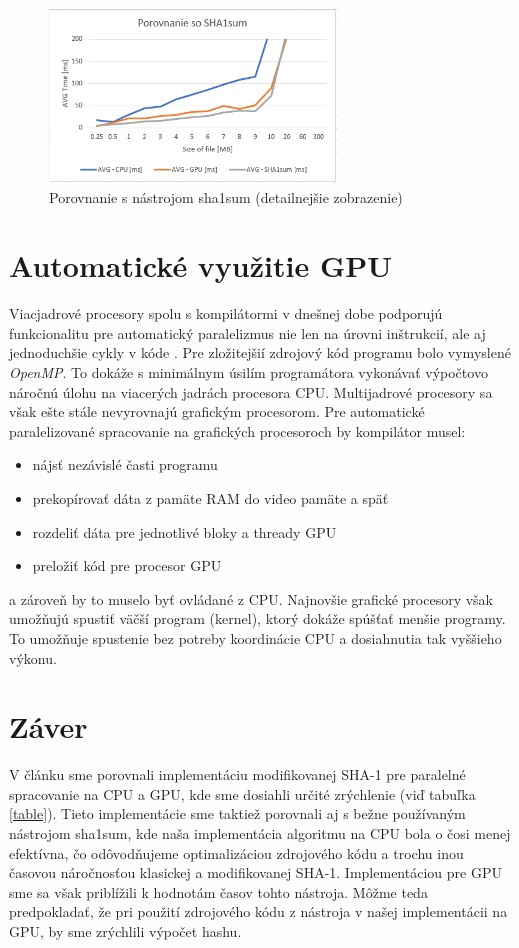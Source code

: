 \documentclass[conference]{IEEEtran}
\begin{document}
\begin{figure}[h!]
\centering
\includegraphics[width=3in]{img/sha1sumdetail}
\caption{Porovnanie s nástrojom sha1sum  (detailnejšie zobrazenie)}
\end{figure}


\section{Automatické využitie GPU}

Viacjadrové procesory spolu s kompilátormi v dnešnej dobe podporujú funkcionalitu pre automatický paralelizmus nie len na úrovni inštrukcií, ale aj jednoduchšie cykly v kóde \cite{automatic}. Pre zložitejšií zdrojový kód programu bolo vymyslené \textit{OpenMP}. To dokáže s minimálnym úsilím programátora vykonávať výpočtovo náročnú úlohu na viacerých jadrách procesora CPU.
Multijadrové procesory sa však ešte stále nevyrovnajú grafickým procesorom. Pre automatické paralelizované spracovanie na grafických procesoroch by kompilátor musel:

\begin{itemize}
	\item{nájsť nezávislé časti programu}
	\item{prekopírovať dáta z pamäte RAM do video pamäte a späť}
	\item{rozdeliť dáta pre jednotlivé bloky a thready GPU}
	\item{preložiť kód pre procesor GPU}
\end{itemize}

a zároveň by to muselo byť ovládané z CPU. Najnovšie grafické procesory však umožňujú spustiť väčší program (kernel), ktorý dokáže spúšťať menšie programy. To umožňuje spustenie bez potreby koordinácie CPU \cite{tatourian} a dosiahnutia tak vyššieho výkonu.

\section{Záver}
V článku sme porovnali implementáciu modifikovanej SHA-1 pre paralelné spracovanie na CPU a GPU, kde sme dosiahli určité zrýchlenie (viď tabuľka \ref{table}). Tieto implementácie sme taktiež porovnali aj s bežne používaným nástrojom sha1sum, kde naša implementácia algoritmu na CPU bola o čosi menej efektívna, čo odôvodňujeme optimalizáciou zdrojového kódu a trochu inou časovou náročnosťou klasickej a modifikovanej SHA-1. Implementáciou pre GPU sme sa však priblížili k hodnotám časov tohto nástroja. Môžme teda predpokladať, že pri použití zdrojového kódu z nástroja v našej implementácii na GPU, by sme zrýchlili výpočet hashu. 
\end{document}
